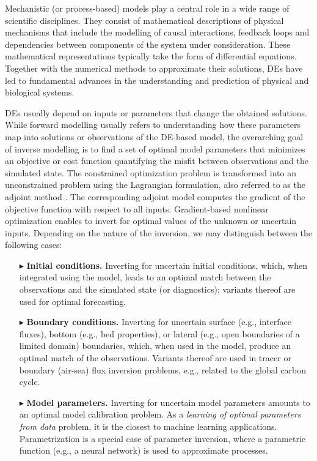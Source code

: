 Mechanistic (or process-based) models play a central role in a wide range of scientific disciplines. 
They consist of mathematical descriptions of physical mechanisms that include the modelling of causal interactions, feedback loops and dependencies between components of the system under consideration. 
These mathematical representations typically take the form of differential equations. 
Together with the numerical methods to approximate their solutions, DEs have led to fundamental advances in the understanding and prediction of physical and biological systems.

DEs usually depend on inputs or parameters that change the obtained solutions. 
While forward modelling usually refers to understanding how these parameters map into solutions or observations of the DE-based model, 
the overarching goal of inverse modelling is to find a set of optimal model parameters that minimizes an objective or cost function quantifying the misfit between observations and the simulated state.
The constrained optimization problem is transformed into an unconstrained problem using the Lagrangian formulation, also referred to as the adjoint method \cite{Vadlamani.2020, Givoli_2021}. 
The corresponding adjoint model computes the gradient of the objective function with respect to all inputs. 
Gradient-based nonlinear optimization enables to invert for optimal values of the unknown or uncertain inputs.
Depending on the nature of the inversion, we may distinguish between the following cases:
\begin{itemize}
    \item[$\blacktriangleright$] \textbf{Initial conditions.} Inverting for uncertain initial conditions, which, when integrated using the model, leads to an optimal match between the observations and the simulated state (or diagnostics); variants thereof are used for optimal forecasting.
    \item[$\blacktriangleright$] \textbf{Boundary conditions.} Inverting for uncertain surface (e.g., interface fluxes), bottom (e.g., bed properties), or lateral (e.g., open boundaries of a limited domain) boundaries, which, when used in the model, produce an optimal match of the observations. Variants thereof are used in tracer or boundary (air-sea) flux inversion problems, e.g., related to the global carbon cycle.
    \item[$\blacktriangleright$] \textbf{Model parameters.} Inverting for uncertain model parameters amounts to an optimal model calibration problem. As a \textit{learning of optimal parameters from data} problem, it is the closest to machine learning applications. Parametrization is a special case of parameter inversion, where a parametric function (e.g., a neural network) is used to approximate processes. 
\end{itemize}
